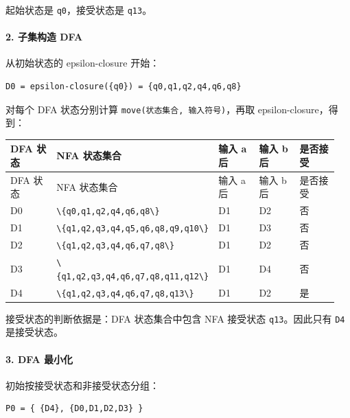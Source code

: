 \documentclass[UTF8]{ctexart}
\begin{document}
起始状态是 \texttt{q0}，接受状态是 \texttt{q13}。

\paragraph*{2. 子集构造 DFA}

从初始状态的 epsilon-closure 开始：

\begin{Verbatim}[fontsize=\small,breaklines=true]
D0 = epsilon-closure({q0}) = {q0,q1,q2,q4,q6,q8}
\end{Verbatim}

对每个 DFA 状态分别计算 \texttt{move(状态集合, 输入符号)}，再取 epsilon-closure，得到：

\begin{longtable}{|p{0.19\linewidth}|p{0.19\linewidth}|p{0.19\linewidth}|p{0.19\linewidth}|p{0.19\linewidth}|}
\hline
DFA 状态 & NFA 状态集合 & 输入 a 后 & 输入 b 后 & 是否接受 \\
\hline
\endfirsthead
DFA 状态 & NFA 状态集合 & 输入 a 后 & 输入 b 后 & 是否接受 \\
\hline
\endhead
D0 & \texttt{\textbackslash{}\{q0,q1,q2,q4,q6,q8\textbackslash{}\}} & D1 & D2 & 否 \\
\hline
D1 & \texttt{\textbackslash{}\{q1,q2,q3,q4,q5,q6,q8,q9,q10\textbackslash{}\}} & D1 & D3 & 否 \\
\hline
D2 & \texttt{\textbackslash{}\{q1,q2,q3,q4,q6,q7,q8\textbackslash{}\}} & D1 & D2 & 否 \\
\hline
D3 & \texttt{\textbackslash{}\{q1,q2,q3,q4,q6,q7,q8,q11,q12\textbackslash{}\}} & D1 & D4 & 否 \\
\hline
D4 & \texttt{\textbackslash{}\{q1,q2,q3,q4,q6,q7,q8,q13\textbackslash{}\}} & D1 & D2 & 是 \\
\hline
\end{longtable}

接受状态的判断依据是：DFA 状态集合中包含 NFA 接受状态 \texttt{q13}。因此只有 \texttt{D4} 是接受状态。

\paragraph*{3. DFA 最小化}

初始按接受状态和非接受状态分组：

\begin{Verbatim}[fontsize=\small,breaklines=true]
P0 = { {D4}, {D0,D1,D2,D3} }
\end{Verbatim}
\end{document}
